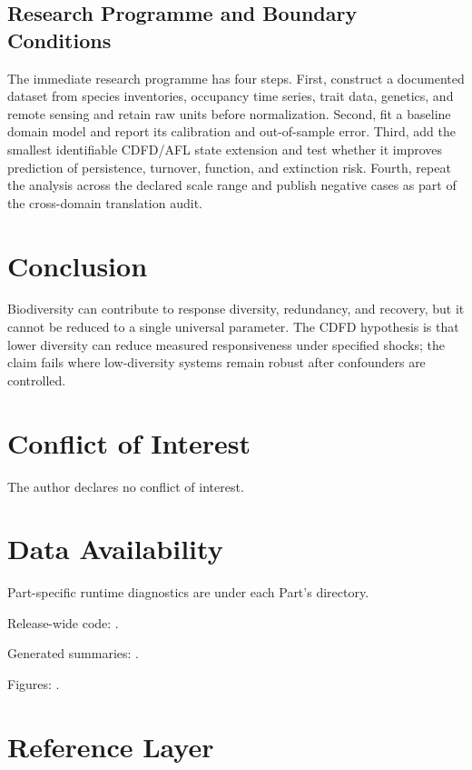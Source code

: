 \documentclass[11pt,a4paper]{article}
\begin{document}
\subsection{Research Programme and Boundary Conditions}

The immediate research programme has four steps. First, construct a documented
dataset from species inventories, occupancy time series, trait data, genetics, and remote sensing and retain raw units before normalization.
Second, fit a baseline domain model and report its calibration and out-of-sample
error. Third, add the smallest identifiable CDFD/AFL state extension and test
whether it improves prediction of persistence, turnover, function, and extinction risk. Fourth, repeat the
analysis across the declared scale range and publish negative cases as part of
the cross-domain translation audit.


\section{Conclusion}
Biodiversity can contribute to response diversity, redundancy, and recovery, but it cannot be reduced to a single universal parameter. The CDFD hypothesis is that lower diversity can reduce measured responsiveness under specified shocks; the claim fails where low-diversity systems remain robust after confounders are controlled.
\section*{Conflict of Interest} The author declares no conflict of interest.
\section*{Data Availability}
Part-specific runtime diagnostics are under each Part's  directory.

Release-wide code: .

Generated summaries: .

Figures: .


\section{Reference Layer}


\end{document}
